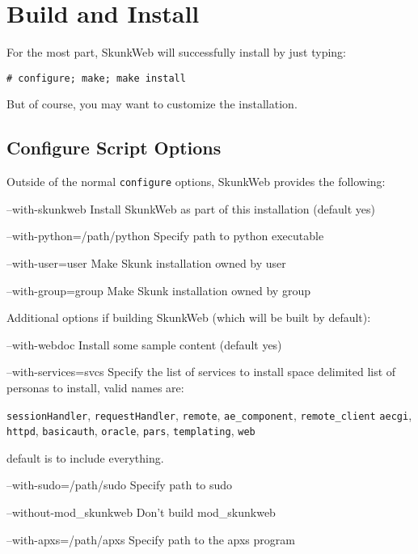 \documentclass[titlepage]{manual}
\begin{document}
\chapter{Build and Install}
For the most part, SkunkWeb will successfully install by just typing:
\begin{verbatim}
# configure; make; make install
\end{verbatim}
But of course, you may want to customize the installation.

\section{Configure Script Options}
Outside of the normal \texttt{configure} options, SkunkWeb provides
the following:

\begin{argdesc}
\item[--with-skunkweb]       Install SkunkWeb as part of this installation (default yes)
\item[--with-python=/path/python]   Specify path to python executable
\item[--with-user=user]        Make Skunk installation owned by user
\item[--with-group=group]      Make Skunk installation owned by group
\end{argdesc}

Additional options if building SkunkWeb (which will be built by default):
\begin{argdesc}
\item[--with-webdoc] Install some sample content (default yes)
\item[--with-services=svcs] Specify the list of services to
install space delimited list of personas to install, valid names are:

\texttt{sessionHandler}, \texttt{requestHandler}, \texttt{remote},
\texttt{ae_component}, \texttt{remote_client}
\texttt{aecgi}, \texttt{httpd}, \texttt{basicauth}, \texttt{oracle},
\texttt{pars}, \texttt{templating}, \texttt{web}

default is to include everything.

\item[--with-sudo=/path/sudo]  Specify path to sudo
\item[--without-mod_skunkweb]  Don't build mod_skunkweb
\item[--with-apxs=/path/apxs]  Specify path to the apxs program
\end{argdesc}
\end{document}
